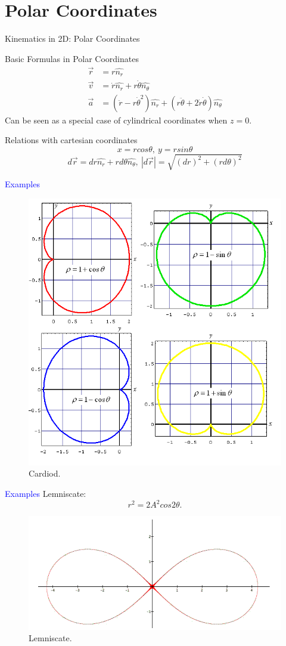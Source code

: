 \documentclass{beamer}
\begin{document}
\section{Polar Coordinates}
\begin{frame}{Kinematics in 2D: Polar Coordinates}
  \begin{block}{Basic Formulas in Polar Coordinates}
    \begin{align}\vec{r}&=r\hat{n_r}\\
      \vec{v}&=\dot{r}\hat{n_r}+r\dot{\theta}\hat{n_\theta}\\
      \vec{a}&=(\ddot{r}-r\dot{\theta}^2)\hat{n_r}+(r\ddot{\theta}+2\dot{r}\dot{\theta})\hat{n_\theta}
      \end{align}
  Can be seen as a special case of cylindrical coordinates when $z=0$.
  \end{block}\pause
  \begin{block}{Relations with cartesian coordinates}
    $$x=rcos\theta,\ y=rsin\theta$$
    $$d\vec{r}=dr\hat{n_r}+rd\theta\hat{n_\theta},\ |d\vec{r}|=\sqrt{(dr)^2+(rd\theta)^2}$$
  \end{block}
\end{frame}

\begin{frame}
  \textcolor{blue}{Examples}
  \begin{figure}[htbp]
  \centering
  \includegraphics[width=0.5 \linewidth, angle =0]{CardioidsLabeled.png}
  \caption{Cardiod.}
  \label{fig:1}
  \end{figure}
\end{frame}

\begin{frame}
  \textcolor{blue}{Examples}
  Lemniscate:$$ r^2 = 2A^2 cos 2\theta.$$
  \begin{figure}[htbp]
    \centering
    \includegraphics[width=0.8 \linewidth, angle =0]{Lemniscate.png}
    \caption{Lemniscate.}
    \label{fig:2}
    \end{figure}
\end{frame}
\end{document}
